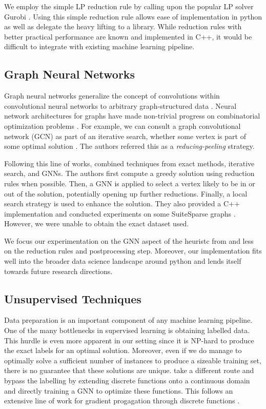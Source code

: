 \documentclass{article}
\begin{document}
We employ the simple LP reduction rule by calling upon the popular LP solver Gurobi \citet{gurobi}.
Using this simple reduction rule allows ease of implementation in python
as well as delegate the heavy lifting to a library.
While reduction rules with better practical performance are known and implemented in C++,
it would be difficult to integrate with existing machine learning pipeline.

\subsection{Graph Neural Networks}
Graph neural networks generalize the concept of convolutions
within convolutional neural networks
to arbitrary graph-structured data \citet{scarselli2008graph}.
Neural network architectures for graphs have made non-trivial progress on combinatorial optimization problems \citet{cappart2021combinatorial}.
For example, we can consult a graph convolutional network (GCN) as part of an iterative search,
whether some vertex is part of some optimal solution \citet{comboptgcn}.
The authors referred this as a \emph{reducing-peeling} strategy.

Following this line of works,
\citet{langedal_et_al} combined techniques from exact methods,
iterative search,
and GNNs.
The authors first compute a greedy solution using reduction rules when possible.
Then, a GNN is applied to select a vertex likely to be in or out of the solution,
potentially opening up further reductions.
Finally, a local search strategy is used to enhance the solution.
They also provided a C++ implementation
and conducted experiments on some SuiteSparse graphs \citet{suitesparse}.
However, we were unable to obtain the exact dataset used.

We focus our experimentation on the GNN aspect of the heuristc from \citet{langedal_et_al}
and less on the reduction rules and postprocessing step.
Moreover, our implementation fits well into the broader data science landscape around python
and lends itself towards future research directions.

\subsection{Unsupervised Techniques}
Data preparation is an important component of any machine learning pipeline.
One of the many bottlenecks in supervised learning is obtaining labelled data.
This hurdle is even more apparent in our setting
since it is NP-hard to produce the exact labels for an optimal solution.
Moreover, even if we do manage to optimally solve a sufficient number of instances
to produce a sizeable training set,
there is no guarantee that these solutions are unique.
\citet{karalias2022neural} take a different route
and bypass the labelling by extending discrete functions onto a continuous domain
and directly training a GNN to optimize these functions.
This follows an extensive line of work for gradient progagation
through discrete functions \citet{williams1992simple,bengio2013estimating,karalias2020erdos}.
\end{document}
